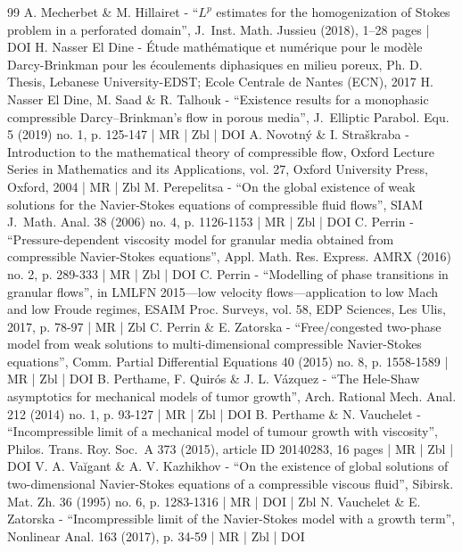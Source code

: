 \documentclass[10pt]{amsart}
\newcommand{\<}{\bigl\langle}
\renewcommand{\>}{\bigr\rangle}
\theoremstyle{definition}
\theoremstyle{remark}
\begin{document}
\begin{thebibliography}{99}
A. Mecherbet \& M. Hillairet - “$L^{p}$ estimates for the homogenization of Stokes problem in a perforated domain”, J. Inst. Math. Jussieu (2018), 1–28 pages | DOI
H. Nasser El Dine - Étude mathématique et numérique pour le modèle Darcy-Brinkman pour les écoulements diphasiques en milieu poreux, Ph. D. Thesis, Lebanese University-EDST; Ecole Centrale de Nantes (ECN), 2017
H. Nasser El Dine, M. Saad \& R. Talhouk - “Existence results for a monophasic compressible Darcy–Brinkman’s flow in porous media”, J. Elliptic Parabol. Equ. 5 (2019) no. 1, p. 125-147 | MR | Zbl | DOI
A. Novotný \& I. Straškraba - Introduction to the mathematical theory of compressible flow, Oxford Lecture Series in Mathematics and its Applications, vol. 27, Oxford University Press, Oxford, 2004 | MR | Zbl
M. Perepelitsa - “On the global existence of weak solutions for the Navier-Stokes equations of compressible fluid flows”, SIAM J. Math. Anal. 38 (2006) no. 4, p. 1126-1153 | MR | Zbl | DOI
C. Perrin - “Pressure-dependent viscosity model for granular media obtained from compressible Navier-Stokes equations”, Appl. Math. Res. Express. AMRX (2016) no. 2, p. 289-333 | MR | Zbl | DOI
C. Perrin - “Modelling of phase transitions in granular flows”, in LMLFN 2015—low velocity flows—application to low Mach and low Froude regimes, ESAIM Proc. Surveys, vol. 58, EDP Sciences, Les Ulis, 2017, p. 78-97 | MR | Zbl
C. Perrin \& E. Zatorska - “Free/congested two-phase model from weak solutions to multi-dimensional compressible Navier-Stokes equations”, Comm. Partial Differential Equations 40 (2015) no. 8, p. 1558-1589 | MR | Zbl | DOI
B. Perthame, F. Quirós \& J. L. Vázquez - “The Hele-Shaw asymptotics for mechanical models of tumor growth”, Arch. Rational Mech. Anal. 212 (2014) no. 1, p. 93-127 | MR | Zbl | DOI
B. Perthame \& N. Vauchelet - “Incompressible limit of a mechanical model of tumour growth with viscosity”, Philos. Trans. Roy. Soc. A 373 (2015), article ID 20140283, 16 pages | MR | Zbl | DOI
V. A. Vaĭgant \& A. V. Kazhikhov - “On the existence of global solutions of two-dimensional Navier-Stokes equations of a compressible viscous fluid”, Sibirsk. Mat. Zh. 36 (1995) no. 6, p. 1283-1316 | MR | DOI | Zbl
N. Vauchelet \& E. Zatorska - “Incompressible limit of the Navier-Stokes model with a growth term”, Nonlinear Anal. 163 (2017), p. 34-59 | MR | Zbl | DOI
\end{thebibliography}
\end{document}
